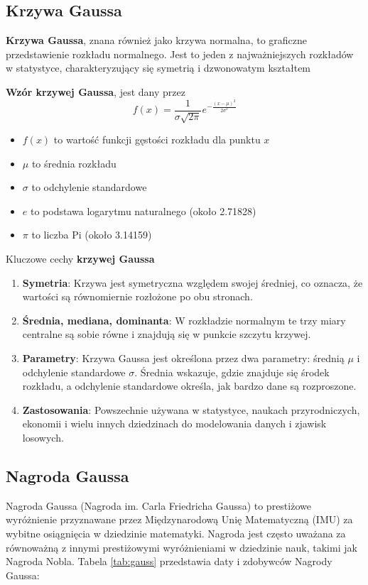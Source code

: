 \subsection{Krzywa Gaussa}
\hspace{\parindent} \textbf{Krzywa Gaussa}, znana również jako krzywa normalna, to graficzne przedstawienie rozkładu normalnego. Jest to jeden z najważniejszych rozkładów w statystyce, charakteryzujący się symetrią i dzwonowatym kształtem
\par \textbf {Wzór krzywej Gaussa}, jest dany przez
\[f(x) = \frac{1}{\sigma \sqrt{2\pi}} e^{-\frac{(x - \mu)^2}{2\sigma^2}}\]
\begin{itemize}
    \renewcommand\labelitemi{--}
    \item $f(x)$ to wartość funkcji gęstości rozkładu dla punktu $x$
    \item \( \mu\) to średnia rozkładu
    \item \(\sigma\) to odchylenie standardowe
    \item $e$ to podstawa logarytmu naturalnego (około 2.71828)
    \item \(\pi\) to liczba Pi (około 3.14159)
\end{itemize}
\vspace{0,5cm} 
\par Kluczowe cechy \textbf{krzywej Gaussa}
\begin{enumerate}
    \item \textbf{Symetria}: Krzywa jest symetryczna względem swojej średniej, co oznacza, że wartości są równomiernie rozłożone po obu stronach.
    \item \textbf{Średnia, mediana, dominanta}: W rozkładzie normalnym te trzy miary centralne są sobie równe i znajdują się w punkcie szczytu krzywej.
    \item \textbf{Parametry}: Krzywa Gaussa jest określona przez dwa parametry: średnią \( \mu\) i odchylenie standardowe \(\sigma\). Średnia wskazuje, gdzie znajduje się środek rozkładu, a odchylenie standardowe określa, jak bardzo dane są rozproszone.
    \item \textbf{Zastosowania}: Powszechnie używana w statystyce, naukach przyrodniczych, ekonomii i wielu innych dziedzinach do modelowania danych i zjawisk losowych.
\end{enumerate}

\subsection{Nagroda Gaussa}
\par Nagroda Gaussa (Nagroda im. Carla Friedricha Gaussa) to prestiżowe wyróżnienie przyznawane przez Międzynarodową Unię Matematyczną (IMU) za wybitne osiągnięcia w dziedzinie matematyki. Nagroda jest często uważana za równoważną z innymi prestiżowymi wyróżnieniami w dziedzinie nauk, takimi jak Nagroda Nobla. Tabela \ref{tab:gauss} przedstawia daty i zdobywców Nagrody Gaussa:



